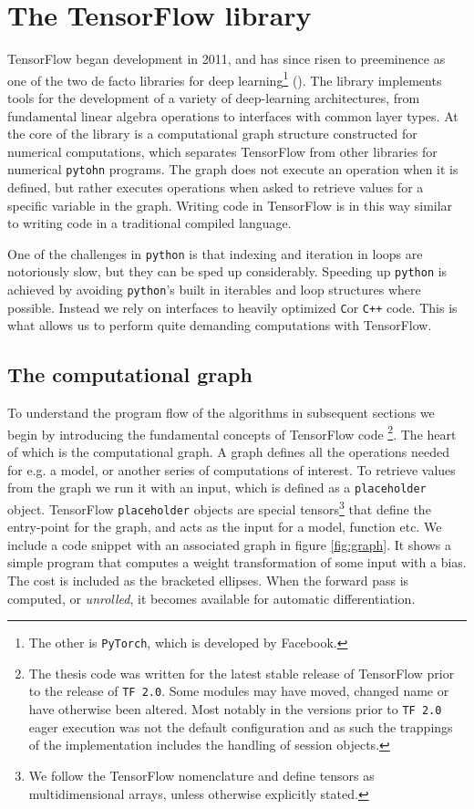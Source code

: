 \section{The TensorFlow library}\label{sec:TensorFlow}

TensorFlow began development in 2011, and has since risen to preeminence as one of the two de facto libraries for deep learning\footnote{The other is \lstinline{PyTorch}, which is developed by Facebook.} (\cite{tensorflow}). The library implements tools for the development of a variety of deep-learning architectures, from fundamental linear algebra operations to interfaces with common layer types. At the core of the library is a computational graph structure constructed for numerical computations, which separates TensorFlow from other libraries for numerical \lstinline{pytohn} programs. The graph does not execute an operation when it is defined, but rather executes operations when asked to retrieve values for a specific variable in the graph. Writing code in TensorFlow is in this way similar to writing code in a traditional compiled language.

One of the challenges in \lstinline{python} is that indexing and iteration in loops are notoriously slow, but they can be sped up considerably. Speeding up \lstinline{python} is achieved by avoiding \lstinline{python}'s built in iterables and loop structures where possible. Instead we rely on interfaces to heavily optimized \lstinline{C}or \lstinline{C++} code. This is what allows us to perform quite demanding computations with TensorFlow.

\subsection{The computational graph}

To understand the program flow of the algorithms in subsequent sections we begin by introducing the fundamental concepts of TensorFlow code \footnote{The thesis code was written for the latest stable release of TensorFlow prior to the release of \lstinline{TF 2.0}. Some modules may have moved, changed name or have otherwise been altered. Most notably in the versions prior to \lstinline{TF 2.0} eager execution was not the default configuration and as such the trappings of the implementation includes the handling of session objects.}. The heart of which is the computational graph. A graph defines all the operations needed for e.g. a model, or another series of computations of interest. To retrieve values from the graph we run it with an input, which is defined as a \lstinline{placeholder} object. TensorFlow \lstinline{placeholder} objects are special tensors\footnote{We follow the TensorFlow nomenclature and define tensors as multidimensional arrays, unless otherwise explicitly stated.} that define the entry-point for the graph, and acts as the input for a model, function etc. We include a code snippet with an associated graph in figure \ref{fig:graph}. It shows a simple program that computes a weight transformation of some input with a bias. The cost is included as the bracketed ellipses. When the forward pass is computed, or \textit{unrolled}, it becomes available for automatic differentiation. 

